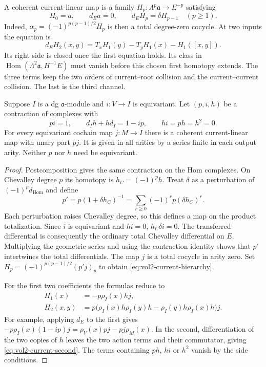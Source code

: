 A coherent current-linear map is a family
$H_p:\Lambda^p\mathfrak a\to E^{-p}$ satisfying
\begin{equation}\label{eq:vol2-current-hierarchy}
 H_0=a,\qquad d_Ea=0,\qquad d_EH_p=\delta H_{p-1}\quad(p\geq1).
\end{equation}
Indeed, $\alpha_p=(-1)^{p(p-1)/2}H_p$ is then a total degree-zero
cocycle. At two inputs the equation is
\begin{equation}\label{eq:vol2-current-second}
 d_EH_2(x,y)=T_xH_1(y)-T_yH_1(x)-H_1([x,y]).
\end{equation}
Its right side is closed once the first equation holds. Its class in
$\operatorname{Hom}(\Lambda^2\mathfrak a,H^{-1}E)$ must vanish
before this chosen first homotopy extends. The three terms keep the
two orders of current--root collision and the current--current
collision. The last is the third channel.

\begin{theorem}\label{thm:vol2-resolved-current}
Suppose $I$ is a dg $\mathfrak a$-module and $i:V\to I$ is equivariant.
Let $(p,i,h)$ be a contraction of complexes with
\[
 pi=1,\qquad d_Ih+hd_I=1-ip,\qquad hi=ph=h^2=0.
\]
For every equivariant cochain map $j:M\to I$ there is a coherent
current-linear map with unary part $pj$. It is given in all arities
by a series finite in each output arity. Neither $p$ nor $h$ need
be equivariant.
\end{theorem}
\begin{proof}
Postcomposition gives the same contraction on the Hom complexes.
On Chevalley degree $p$ its homotopy is $h_C=(-1)^ph$. Treat
$\delta$ as a perturbation of $(-1)^pd_{\mathrm{Hom}}$ and define
\begin{equation}\label{eq:vol2-current-transfer}
 p'=p(1+\delta h_C)^{-1}
    =\sum_{r\geq0}(-1)^rp(\delta h_C)^r.
\end{equation}
Each perturbation raises Chevalley degree, so this defines a map on
the product totalization. Since $i$ is equivariant and $hi=0$,
$h_C\delta i=0$. The transferred differential is consequently
the ordinary total Chevalley differential on $E$.
Multiplying the geometric series and using the contraction identity
shows that $p'$ intertwines the total differentials. The map $j$ is
a total cocycle in arity zero. Set
$H_p=(-1)^{p(p-1)/2}(p'j)_p$ to obtain
\eqref{eq:vol2-current-hierarchy}.

For the first two coefficients the formulas reduce to
\begin{align}\label{eq:vol2-current-transfer-first}
 H_1(x)&=-p\rho_I(x)hj,\\
 H_2(x,y)&=p\bigl(\rho_I(x)h\rho_I(y)h
                      -\rho_I(y)h\rho_I(x)h\bigr)j.
 \label{eq:vol2-current-transfer-second}
\end{align}
For example, applying $d_E$ to the first gives
$-p\rho_I(x)(1-ip)j=\rho_V(x)pj-pj\rho_M(x)$.
In the second, differentiation of the two copies of $h$ leaves
the two action terms and their commutator, giving
\eqref{eq:vol2-current-second}. The terms containing $ph$, $hi$
or $h^2$ vanish by the side conditions.
\end{proof}

